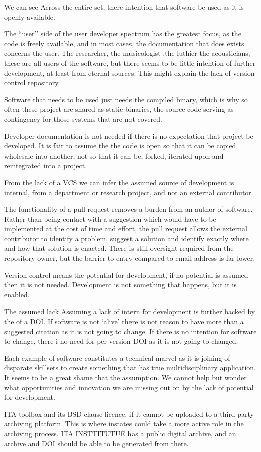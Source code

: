 We can see  Across the entire set, there
intention that software be used as it is openly available. 

The ``user’’ side of
the user developer spectrum has the greatest focus, as the code is freely
available, and in most cases, the documentation that does exists concerns the
user. The researcher, the musicologist ,the luthier the acousticians, these are
all users of the software, but there seems to be little intention of further
development, at least from eternal sources. This might explain the lack of
version control repository. 

Software that needs to be used just needs the compiled binary, which is why so
often these project are shared as static binaries, the source code serving as
contingency for those systems that are not covered.

Developer documentation is not needed if there is no expectation that project be
developed. It is fair to assume the the code is open so that it can be copied
wholesale into another, not so that it can be, forked, iterated upon and
reintegrated into a project.

From the lack of a VCS we can infer the assumed source of development is
internal, from a department or research project, and not an external
contributor.

The functionality of a pull request removes a burden from an author of software.
Rather than being contact with a suggestion which would have to be implemented
at the cost of time and effort, the pull request allows the external contributor
to identify a problem, suggest a solution and identify exactly where and how
that solution is enacted. There is still oversight required from the repository
owner, but the barrier to entry compared to email address is far lower.

Version control means the potential for development, if no potential is assumed
then it is not needed. Development is not something that happens, but it is
enabled.

The assumed lack Assuming a lack of intern for development is further backed by
the of a DOI. If software is not `alive’ there is not reason to have more than a
suggested citation as it is not going to change. If there is no intention for
software to change, there i no need for per version DOI as it is not going to
changed.

Each example of software constitutes a technical marvel as it is joining of
disparate skillsets to create something that has true multidisciplinary
application. It seems to be a great shame that the assumption. We cannot help
but wonder what opportunities and innovation we are missing out on by the lack
of potential for development.

ITA toolbox and its BSD clause licence, if it cannot be uploaded to a third
party archiving platform. This is where instates could take a more active role
in the archiving process. ITA INSTTITUTUE has a public digital archive, and an
archive and DOI should be able to be generated from there.